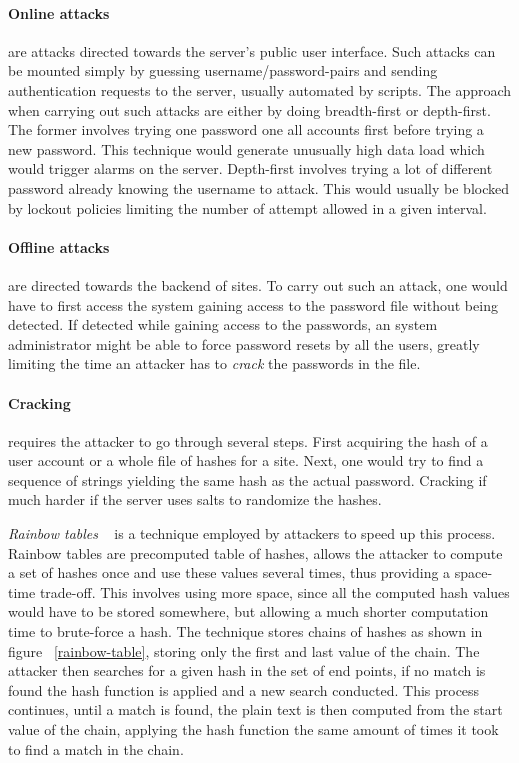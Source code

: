 \paragraph{Online attacks} are attacks directed towards the server's public user interface. Such attacks can be mounted simply by guessing username/password-pairs and sending authentication requests to the server, usually automated by scripts. The approach when carrying out such attacks are either by doing breadth-first or depth-first. The former involves trying one password one all accounts first before trying a new password. This technique would generate unusually high data load which would trigger alarms on the server. Depth-first involves trying a lot of different password already knowing the username to attack. This would usually be blocked by lockout policies limiting the number of attempt allowed in a given interval.

\paragraph{Offline attacks} are directed towards the backend of sites. To carry out such an attack, one would have to first access the system gaining access to the password file without being detected. If detected while gaining access to the passwords, an system administrator might be able to force password resets by all the users, greatly limiting the time an attacker has to \emph{crack} the passwords in the file.

\paragraph{Cracking} requires the attacker to go through several steps. First acquiring the hash of a user account or a whole file of hashes for a site. Next, one would try to find a sequence of strings yielding the same hash as the actual password. Cracking if much harder if the server uses salts to randomize the hashes.
\par \emph{ Rainbow tables }~\cite{rainbow-tables} is a technique employed by attackers to speed up this process. Rainbow tables are precomputed table of hashes, allows the attacker to compute a set of hashes once and use these values several times, thus providing a space-time trade-off. This involves using more space, since all the computed hash values would have to be stored somewhere, but allowing a much shorter computation time to brute-force a hash. The technique stores chains of hashes as shown in figure ~\ref{rainbow-table}, storing only the first and last value of the chain. The attacker then searches for a given hash in the set of end points, if no match is found the hash function is applied and a new search conducted. This process continues, until a match is found, the plain text is then computed from the start value of the chain, applying the hash function the same amount of times it took to find a match in the chain. 

